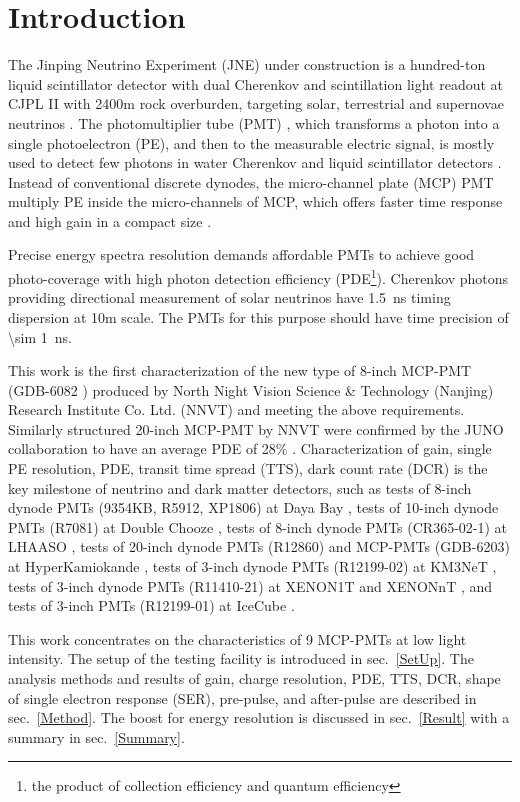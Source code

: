 \section{Introduction}
The Jinping Neutrino Experiment (JNE) under construction is a hundred-ton liquid scintillator detector with dual Cherenkov and scintillation light readout
 at CJPL II with 2400m rock overburden, targeting solar, terrestrial and supernovae neutrinos \cite{LetterJNE2017}.
The photomultiplier tube (PMT) \cite{HAMAMATSUManual}, which transforms a photon into a single photoelectron (PE), and then to the measurable electric signal, is mostly used to detect few photons in water Cherenkov \cite{SNO,SuperK} and liquid scintillator detectors \cite{KamLAND,JUNO:2015zny}. Instead of conventional discrete dynodes, the micro-channel plate (MCP) PMT multiply PE inside the micro-channels of MCP, which offers faster time response and high gain in a compact size \cite{HAMAMATSUManual}.

Precise energy spectra resolution demands affordable PMTs to achieve good photo-coverage with high photon detection efficiency (PDE\footnote{the product of collection efficiency and quantum efficiency}). Cherenkov photons providing directional measurement of solar neutrinos have \SI{1.5}{ns} timing dispersion at 10m scale. The PMTs for this purpose should have time precision of \SI{\sim 1}{ns}.


This work is the first characterization of
 the new type of 8-inch MCP-PMT (GDB-6082 \cite{GDB-6082}) produced by North Night Vision Science \& Technology (Nanjing) Research Institute Co. Ltd. (NNVT) and meeting the above requirements. %
Similarly structured 20-inch MCP-PMT by NNVT were confirmed by the JUNO collaboration to have an average PDE of 28\% \cite{JUNOMassTesting}.
Characterization of gain, single PE resolution, PDE, transit time spread (TTS), dark count rate (DCR) is the key milestone of neutrino and dark matter detectors, such as tests of
 8-inch dynode PMTs (9354KB, R5912, XP1806) at Daya Bay \cite{DayaBayTesting}, tests of 10-inch dynode PMTs (R7081) at Double Chooze \cite{DoubleChoozeTesting}, tests of 8-inch dynode PMTs (CR365-02-1) at LHAASO \cite{LHAASOTesting}, tests of 20-inch dynode PMTs (R12860) and MCP-PMTs (GDB-6203) at HyperKamiokande \cite{HyperKTesting}, tests of 3-inch dynode PMTs (R12199-02) at KM3NeT \cite{KM3NetTesting}, tests of 3-inch dynode PMTs (R11410-21) at XENON1T and XENONnT \cite{XENON1TTesting}\cite{XENONnTTesting}, and tests of 3-inch PMTs (R12199-01) at IceCube \cite{IceCubeTesting}.

This work concentrates on the characteristics of 9 MCP-PMTs at low light intensity. The setup of the testing facility is introduced in sec.~\ref{SetUp}. The analysis methods and results of gain, charge resolution, PDE, TTS, DCR, shape of single electron response (SER), pre-pulse, and after-pulse are described in sec.~\ref{Method}. The boost for energy resolution is discussed in sec.~\ref{Result} with a summary in sec.~\ref{Summary}.
